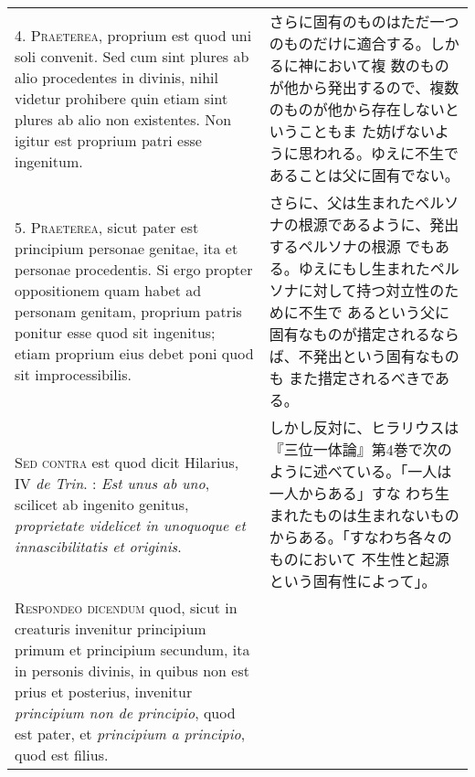 \documentclass[10pt]{jsarticle} %
\begin{document}
\begin{longtable}{p{21em}p{21em}}
\\



4. {\scshape Praeterea}, proprium est quod uni soli convenit. Sed cum sint plures ab
alio procedentes in divinis, nihil videtur prohibere quin etiam sint
plures ab alio non existentes. Non igitur est proprium patri esse
ingenitum.


&

さらに固有のものはただ一つのものだけに適合する。しかるに神において複
 数のものが他から発出するので、複数のものが他から存在しないということもま
 た妨げないように思われる。ゆえに不生であることは父に固有でない。

\\



5. {\scshape Praeterea}, sicut pater est principium personae genitae, ita et
personae procedentis. Si ergo propter oppositionem quam habet ad
personam genitam, proprium patris ponitur esse quod sit ingenitus;
etiam proprium eius debet poni quod sit improcessibilis.


&

さらに、父は生まれたペルソナの根源であるように、発出するペルソナの根源
 でもある。ゆえにもし生まれたペルソナに対して持つ対立性のために不生で
 あるという父に固有なものが措定されるならば、不発出という固有なものも
 また措定されるべきである。


\\



{\scshape Sed contra} est quod dicit Hilarius, IV {\itshape de
 Trin}. : {\itshape Est unus ab uno},
scilicet ab ingenito genitus, {\itshape proprietate videlicet in unoquoque et
innascibilitatis et originis}.


&

しかし反対に、ヒラリウスは『三位一体論』第4巻で次のように述べている。「一人は一人からある」すな
 わち生まれたものは生まれないものからある。「すなわち各々のものにおいて
 不生性と起源という固有性によって」。


\\



{\scshape Respondeo dicendum} quod, sicut in creaturis invenitur principium
primum et principium secundum, ita in personis divinis, in quibus non
est prius et posterius, invenitur {\itshape principium non de principio}, quod
est pater, et {\itshape principium a principio}, quod est filius. 

&


\end{longtable}
\end{document}
